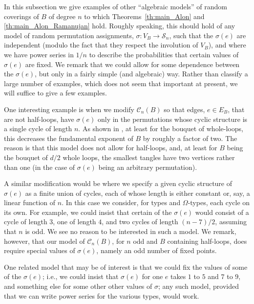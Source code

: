 \documentclass{memo-l}
\theoremstyle{plain}
\theoremstyle{definition}
\numberwithin{section}{chapter}
\numberwithin{equation}{chapter}
\newcommand{\from}{\colon}
\theoremstyle{plain}
\theoremstyle{definition}
\newcommand\cC{\mathcal{C}}
\newcommand\cS{\mathcal{S}}
\begin{document}
In this subsection we give examples of other ``algebraic models''
of random coverings of $B$ of degree $n$ to which 
Theorems~\ref{th:main_Alon} and \ref{th:main_Alon_Ramanujan}
hold.
Roughly speaking, this should hold of any model of
random permutation assignments, $\sigma\from V_B\to \cS_n$,
such that the $\sigma(e)$ are independent (modulo the fact
that they respect the involution of $V_B$), and where we 
have power series in $1/n$ to describe the probabilities that
certain values of $\sigma(e)$ are fixed.
We remark that we could allow for some dependence between
the $\sigma(e)$, but only in a fairly simple (and algebraic)
way.  Rather than classify a large number of examples,
which does not seem that important at present,
we will suffice to give a few examples.

One interesting example is when we modify $\cC_n(B)$ so that
edges, $e\in E_B$, that are not half-loops, have $\sigma(e)$
only in the permutations whose cyclic structure is a single
cycle of length $n$.
As shown in \cite{friedman_alon}, at least for the bouquet of
whole-loops, this decreases the fundamental exponent of $B$ by
roughly a factor of two.
The reason is that this model does not allow for half-loops,
and, at least for $B$ being the bouquet of $d/2$ whole loops,
the smallest tangles have two vertices rather than one (in the
case of $\sigma(e)$ being an arbitrary permutation).

A similar modification would be where we specify a given cyclic
structure of $\sigma(e)$ as a finite union of cycles, each of
whose length is either constant or, say, a linear function of $n$.
In this case we consider, for types and $\Omega$-types, each
cycle on its own.  For example, we could insist that certain
of the $\sigma(e)$ would consist of a cycle of length $3$, one
of length $4$, and two cycles of length $(n-7)/2$, assuming that
$n$ is odd.  
We see no reason to be interested in such a model.
We remark, however, that our model of $\cC_n(B)$, for $n$ odd and 
$B$ containing
half-loops, does require special values of $\sigma(e)$, namely
an odd number of fixed points.

One related model that may be of interest is that we could fix
the values of some of the $\sigma(e)$; i.e., we could insist that
$\sigma(e)$ for one $e$ takes $1$ to $5$ and $7$ to $9$, and 
something else for some other other values of $\sigma$;
any such model, provided that we can write power series for the
various types, would work.
\end{document}
